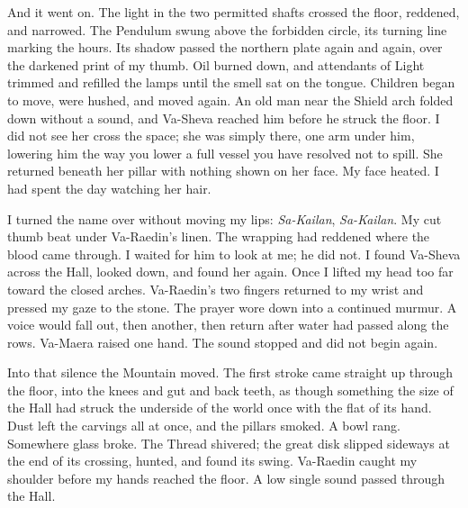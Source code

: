 And it went on. The light in the two permitted shafts crossed the floor, reddened, and narrowed. The Pendulum swung above the forbidden circle, its turning line marking the hours. Its shadow passed the northern plate again and again, over the darkened print of my thumb. Oil burned down, and attendants of Light trimmed and refilled the lamps until the smell sat on the tongue. Children began to move, were hushed, and moved again. An old man near the Shield arch folded down without a sound, and Va-Sheva reached him before he struck the floor. I did not see her cross the space; she was simply there, one arm under him, lowering him the way you lower a full vessel you have resolved not to spill. She returned beneath her pillar with nothing shown on her face. My face heated. I had spent the day watching her hair.\par

I turned the name over without moving my lips: \textit{Sa-Kailan}, \textit{Sa-Kailan}. My cut thumb beat under Va-Raedin's linen. The wrapping had reddened where the blood came through. I waited for him to look at me; he did not. I found Va-Sheva across the Hall, looked down, and found her again. Once I lifted my head too far toward the closed arches. Va-Raedin's two fingers returned to my wrist and pressed my gaze to the stone. The prayer wore down into a continued murmur. A voice would fall out, then another, then return after water had passed along the rows. Va-Maera raised one hand. The sound stopped and did not begin again.\par

Into that silence the Mountain moved. The first stroke came straight up through the floor, into the knees and gut and back teeth, as though something the size of the Hall had struck the underside of the world once with the flat of its hand. Dust left the carvings all at once, and the pillars smoked. A bowl rang. Somewhere glass broke. The Thread shivered; the great disk slipped sideways at the end of its crossing, hunted, and found its swing. Va-Raedin caught my shoulder before my hands reached the floor. A low single sound passed through the Hall.\par

